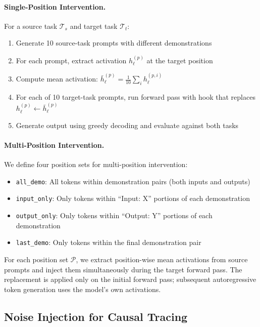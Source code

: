 \documentclass[runningheads]{llncs}
\begin{document}
\paragraph{Single-Position Intervention.} For a source task $\mathcal{T}_s$ and target task $\mathcal{T}_t$:
\begin{enumerate}
    \item Generate 10 source-task prompts with different demonstrations
    \item For each prompt, extract activation $h_\ell^{(p)}$ at the target position
    \item Compute mean activation: $\bar{h}_\ell^{(p)} = \frac{1}{10}\sum_i h_\ell^{(p,i)}$
    \item For each of 10 target-task prompts, run forward pass with hook that replaces $h_\ell^{(p)} \leftarrow \bar{h}_\ell^{(p)}$
    \item Generate output using greedy decoding and evaluate against both tasks
\end{enumerate}

\paragraph{Multi-Position Intervention.} We define four position sets for multi-position intervention:
\begin{itemize}
    \item \texttt{all\_demo}: All tokens within demonstration pairs (both inputs and outputs)
    \item \texttt{input\_only}: Only tokens within ``Input: X'' portions of each demonstration
    \item \texttt{output\_only}: Only tokens within ``Output: Y'' portions of each demonstration
    \item \texttt{last\_demo}: Only tokens within the final demonstration pair
\end{itemize}

For each position set $\mathcal{P}$, we extract position-wise mean activations from source prompts and inject them simultaneously during the target forward pass. The replacement is applied only on the initial forward pass; subsequent autoregressive token generation uses the model's own activations.

\subsection{Noise Injection for Causal Tracing}
\end{document}
